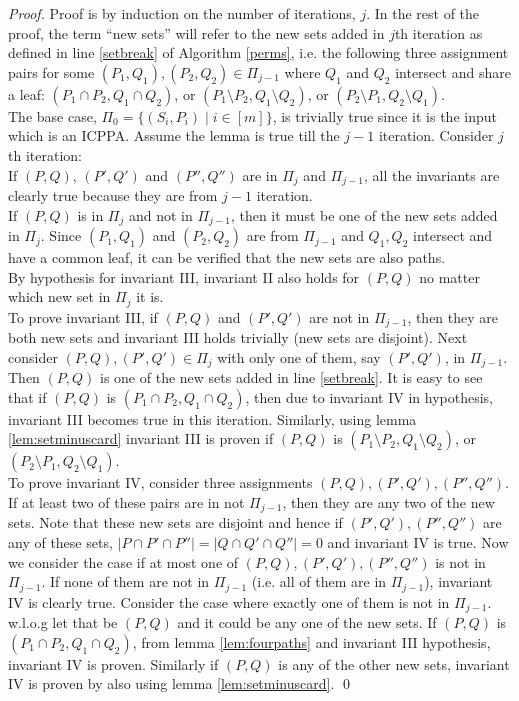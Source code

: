 \documentclass{llncs}
\begin{document}
\begin{proof}
  Proof is by induction on the number of iterations, $j$. In the rest
  of the proof, the term ``new sets'' will refer to the new sets added
  in $j$th iteration as defined in line \ref{setbreak} of Algorithm
  \ref{perms}, i.e. the following three assignment pairs for
  some $(P_1,Q_1), (P_2,Q_2) \in \Pi_{j-1}$ where $Q_1$ and $Q_2$
  intersect and share a leaf: $(P_1 \cap P_2, Q_1 \cap Q_2)$, or $(P_1
  \setminus P_2, Q_1 \setminus Q_2)$, or $(P_2 \setminus P_1, Q_2
  \setminus Q_1)$.\\
  \noindent
  The base
  case, $\Pi_0 = \{(S_i,P_i) \mid i \in [m]\}$, is trivially true since it
  is the input which is an ICPPA.  Assume the lemma is true till the $j-1$
  iteration. Consider $j$th
  iteration:\\
  \noindent
  If $(P,Q)$, $(P',Q')$ and $(P'',Q'')$ are in $\Pi_{j}$ and
  $\Pi_{j-1}$, all the invariants are
  clearly true because they are from $j-1$ iteration.\\
  If $(P,Q)$ is in $\Pi_{j}$ and not in $\Pi_{j-1}$, then it must be
  one of the new sets added in $\Pi_j$. Since $(P_1,Q_1)$ and
  $(P_2,Q_2)$ are from $\Pi_{j-1}$ and $Q_1,Q_2$ intersect and have a
  common leaf, it can be verified that the
  new sets are also paths. \\
  By hypothesis for invariant III, invariant II also holds for $(P,Q)$
  no matter which new set in $\Pi_j$ it
  is.\\
  To prove invariant III, if $(P,Q)$ and $(P',Q')$ are not in
  $\Pi_{j-1}$, then they are both new sets and invariant III holds
  trivially (new sets are disjoint). Next consider $(P,Q), (P',Q') \in
  \Pi_j$ with only one of them, say $(P',Q')$, in $\Pi_{j-1}$. Then
  $(P,Q)$ is one of the new sets added in line \ref{setbreak}. It is
  easy to see that if $(P,Q)$ is $(P_1 \cap P_2, Q_1 \cap Q_2)$, then
  due to invariant IV in hypothesis, invariant III becomes true in
  this iteration. Similarly, using lemma \ref{lem:setminuscard}
  invariant III is proven if $(P, Q)$ is $(P_1 \setminus P_2, Q_1
  \setminus Q_2)$, or $(P_2 \setminus P_1, Q_2
  \setminus Q_1)$.\\
  To prove invariant IV, consider three assignments
  $(P,Q),(P',Q'),(P'',Q'')$. If at least two of these pairs are in not
  $\Pi_{j-1}$, then they are any two of the new sets. Note that these
  new sets are disjoint and hence if $(P',Q'), (P'',Q'')$ are any of
  these sets, $|P \cap P' \cap P''|=|Q \cap Q' \cap Q''|=0$ and
  invariant IV is true. Now we consider the case if at most one of
  $(P,Q),(P',Q'),(P'',Q'')$ is not in $\Pi_{j-1}$. If none of them are
  not in $\Pi_{j-1}$ (i.e. all of them are in $\Pi_{j-1}$), invariant
  IV is clearly true. Consider the case where exactly one of them is
  not in $\Pi_{j-1}$. w.l.o.g let that be $(P,Q)$ and it could be any
  one of the new sets. If $(P,Q)$ is $(P_1 \cap P_2, Q_1 \cap Q_2)$,
  from lemma \ref{lem:fourpaths} and invariant III hypothesis,
  invariant IV is proven. Similarly if $(P,Q)$ is any of the other new
  sets, invariant IV is proven by also using lemma
  \ref{lem:setminuscard}. \qed

\end{proof}
\end{document}
